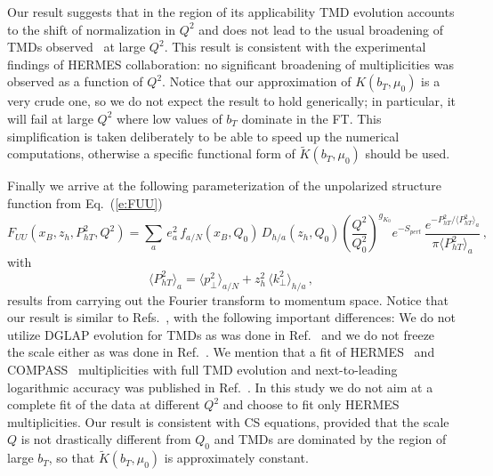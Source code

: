 \documentclass[final,3p,times,onecolumn,sort&compress,hidelinks]{elsarticle}
\newcommand\3[1]{\boldsymbol{#1}}
\begin{document}
Our result suggests that in the region of its applicability TMD evolution accounts to the shift of normalization in $Q^2$ and does not lead to the usual broadening of TMDs observed~\cite{Collins:2011zzd} at large $Q^2$. This result is consistent with the experimental findings \cite{Airapetian:2012ki} of HERMES collaboration: no significant broadening of multiplicities was observed as a function of $Q^2$. Notice that our approximation of $K(b_T,\mu_0)$ is a very crude one, so we do not expect the result to hold generically; in particular, it will fail at large $Q^2$ where low values of $b_T$ dominate in the FT. This simplification is taken deliberately to be able to speed up the numerical computations, otherwise  a specific functional form of $\tilde K(b_T,\mu_0)$ should be used. 


Finally we arrive at the following parameterization of the unpolarized structure function from Eq.~(\ref{e:FUU}) 
\begin{equation}
F_{UU}(x_B,z_h,P_{hT}^2,Q^2)  =  \sum_{a} \, e_a^2 \,f_{a/N}(x_B, Q_0)\,D_{h/a}(z_h, Q_0) \left( \frac{Q^2}{Q_0^2}\right)^{g_{K_0}}e^{-S_{pert}}\,
\frac{e^{-P_{hT}^2/\langle P_{hT}^2 \rangle_a}}{\pi\langle P_{hT}^2 \rangle_a}\,, \label{e:FUU_model}
\end{equation}
with
\begin{equation}
\langle P_{hT}^2 \rangle_a = \langle p_\perp^2 \rangle_{a/N} + z_h^2\, \langle k_\perp^2 \rangle_{h/a}\,, \label{e:avg_kT}
\end{equation}
results from carrying out the Fourier transform to momentum space.
Notice that our result is similar to Refs.~\cite{Anselmino:2013lza,Signori:2013mda}, with the following important differences:
We do not utilize DGLAP evolution for TMDs as was done in Ref.~\cite{Anselmino:2013lza} and we do not freeze the scale either as was done in Ref.~\cite{Signori:2013mda}. We mention that a fit of HERMES~\cite{Airapetian:2012ki}  and COMPASS~\cite{Adolph:2013stb} multiplicities with full TMD evolution and next-to-leading logarithmic accuracy was published in Ref.~\cite{Bacchetta:2017gcc}. In this study we do not aim at a complete fit of the data at different $Q^2$ and choose to fit only HERMES~\cite{Airapetian:2012ki} multiplicities. Our result is consistent with CS equations, provided that the scale $Q$ is not drastically different from $Q_0$ and TMDs are dominated by the region of large $b_T$, so that $\tilde K(b_T,\mu_0)$ is approximately constant.
\end{document}
